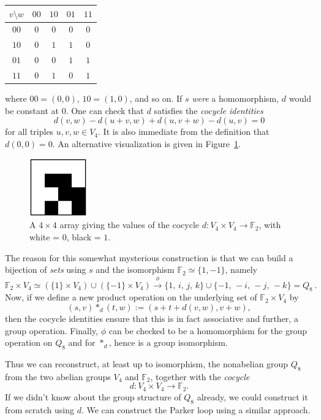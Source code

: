 \documentclass{article}
\theoremstyle{plain}
\theoremstyle{definition}
\def \FF {\mathbb{F}}
\begin{document}
\begin{center}
\begin{tabular*}{0.35\textwidth}{c|cccc}
$v\setminus w$&$00$&$10$&$01$&$11$\\
\hline
	$00$		& $0$& $0$& $0$& $0$\\
	$10$		& $0$& $1$& $1$& $0$\\
	$01$		& $0$& $0$& $1$& $1$\\
	$11$		& $0$& $1$& $0$& $1$\\
\end{tabular*}
\end{center}
where $00=(0,0)$, $10=(1,0)$, and so on.
If $s$ \emph{were} a homomorphism, $d$ would be constant at $0$.
One can check that $d$ satisfies the \emph{cocycle identities}
\[
	d(v,w)-d(u+v,w)+d(u,v+w)-d(u,v) = 0
\]
for all triples $u,v,w\in V_4$. It is also immediate from the definition that $d(0,0)=0$.
An alternative visualization is given in Figure~\ref{fig:cocycle for q8}.

\begin{figure}[!b]
\begin{center}
\includegraphics[height=2.5cm]{quaternion_cocyc} %
\end{center}
\caption{A $4\times4$ array giving the values of the cocycle $d\colon V_4\times V_4\to \FF_2$, with white = $0$, black = $1$.}
\label{fig:cocycle for q8}
\end{figure}


The reason for this somewhat mysterious construction is that we can build a bijection of \emph{sets} using $s$ and the isomorphism $\FF_2\simeq \{1,-1\}$, namely
\[
	\FF_2\times V_4 \simeq \left(\{1\}\times V_4\right) \cup \left(\{-1\} \times V_4\right) \stackrel{\phi}{\longrightarrow}
	\{1,\, i,\, j,\, k\}\cup \{-1,\, -i,\, -j,\, -k\} = Q_8\,.
\]
Now, if we define a new product operation on the underlying set of $\FF_2\times V_4$ by
\[
	(s,v)\ast_d(t,w):=(s+ t+ d(v,w),v+w),
\]
then the cocycle identities ensure that this is in fact associative and further, a group operation.
Finally, $\phi$ can be checked to be a homomorphism for the group operation on $Q_8$ and for $\ast_d$, hence is a group isomorphism.

Thus we can reconstruct, at least up to isomorphism, the nonabelian group $Q_8$ from the two abelian groups $V_4$ and $\FF_2$, together with the \emph{cocycle} 
\[
	d\colon V_4\times V_4\to \FF_2.
\]
If we didn't know about the group structure of $Q_8$ already, we could construct it from scratch using $d$.
We can construct the Parker loop using a similar approach.
\end{document}
